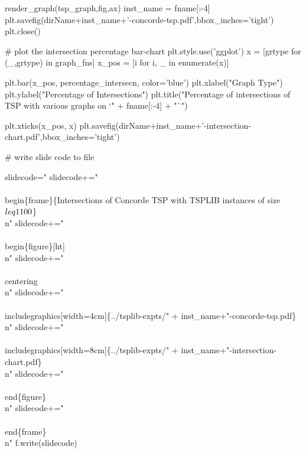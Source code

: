               render_graph(tsp_graph,fig,ax)
              inst_name = fname[:-4]
              plt.savefig(dirName+inst_name+'-concorde-tsp.pdf',bbox_inches='tight')
              plt.close()
              
              # plot the intersection percentage bar-chart
              plt.style.use('ggplot')
              x              = [grtype for (_,grtype) in graph_fns]
              x_pos          = [i for i, _ in enumerate(x)]
     
              plt.bar(x_pos, percentage_intersecn, color='blue')
              plt.xlabel("Graph Type")
              plt.ylabel("Percentage of Intersections")
              plt.title("Percentage of intersections of TSP with various graphs on `" + fname[:-4] + "`")
 
              plt.xticks(x_pos, x)   
              plt.savefig(dirName+inst_name+'-intersection-chart.pdf',bbox_inches='tight')
                   
              # write slide code to file
             
              slidecode="%
              slidecode+="\\\\begin\{frame\}\{Intersections of Concorde TSP with TSPLIB instances of size $\\\\leq 1100$\}\\n"
              slidecode+="\\\\begin\{figure\}[ht]\\n"
              slidecode+="  \\\\centering\\n"
              slidecode+="  \\\\includegraphics[width=4cm]\{../tsplib-expts/" + inst_name+"-concorde-tsp.pdf\}\\n"
              slidecode+="  \\\\includegraphics[width=8cm]\{../tsplib-expts/" + inst_name+"-intersection-chart.pdf\}\\n"
              slidecode+="\\\\end\{figure\}\\n"
              slidecode+="\\\\end\{frame\}\\n"
              f.write(slidecode)


